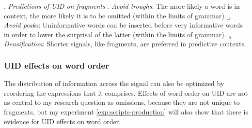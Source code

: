 \ex. \textit{Predictions of UID on fragments} \label{ex:uid-fragments-predictions}
\a. \textit{Avoid troughs}: The more likely a word is in context, the more likely it is to be omitted (within the limits of grammar).\label{ex:uid-fragments-predictions-troughs}
 \b. \textit{Avoid peaks}: Uninformative words can be inserted before very informative words in order to lower the surprisal of the latter (within the limits of grammar).\label{ex:uid-fragments-predictions-peaks}
 \c. \textit{Densification}: Shorter signals, like fragments, are preferred in predictive contexts.\label{ex:uid-fragments-predictions-densification}

\subsubsection{UID effects on word order}
The distribution of information across the signal can also be optimized by reordering the expressions that it comprises. Effects of word order on UID are not as central to my research question as omissions, because they are not unique to fragments, but my experiment \ref{exp:scripts-production} will also show that there is evidence for UID effects on word order.

